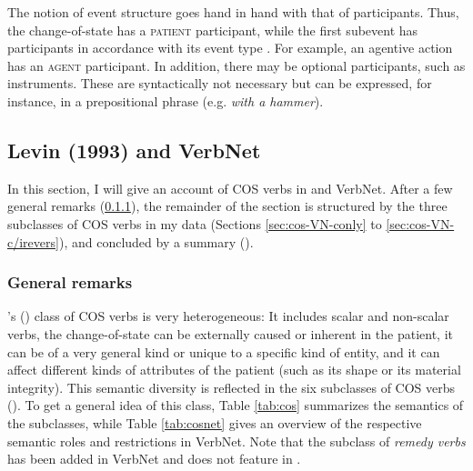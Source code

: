 The notion of event structure goes hand in hand with that of participants.
Thus, the change-of-state has a \textsc{patient} participant, while the first subevent has participants in accordance with its event type \citep[835]{McKoon.2000}. For example, an agentive action has an \textsc{agent} participant. In addition, there may be optional participants, such as instruments. These are syntactically not necessary but can be expressed, for instance, in a prepositional phrase (e.g. \textit{with a hammer}).

\subsection{Levin (1993) and VerbNet} 
\label{sec:cos-input-VN}

In this section, I will give an account of COS verbs in \citet{Levin.1993} and VerbNet. After a few general remarks (\ref{sec:cos-input-VN-general}), the remainder of the section is structured by the three subclasses of COS verbs in my data (Sections \ref{sec:cos-VN-conly} to \ref{sec:cos-VN-c/irevers}), and concluded by a summary (). 

\subsubsection{General remarks} 
\label{sec:cos-input-VN-general} 

\citeauthor{Levin.1993}'s (\citeyear{Levin.1993}) class of COS verbs is very heterogeneous: It includes scalar and non-scalar verbs, the change-of-state can be externally caused or inherent in the patient, it can be of a very general kind or unique to a specific kind of entity, and it can affect different kinds of attributes of the patient (such as its shape or its material integrity). 
This semantic diversity is reflected in the six subclasses of COS verbs (\citealt[240--248]{Levin.1993}). To get a general idea of this class, Table \ref{tab:cos} summarizes the semantics of the subclasses, while Table \ref{tab:cosnet} gives an overview of the respective semantic roles and restrictions in VerbNet. Note that the subclass of \textit{remedy verbs} has been added in VerbNet and does not feature in \citet{Levin.1993}.

